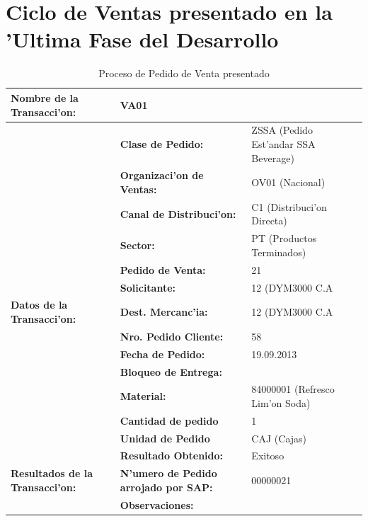 \section{Ciclo de Ventas presentado en la 'Ultima Fase del Desarrollo}
\begin{table}[h!]
\footnotesize
\scalebox{0.8} {
\begin{tabular}{l l l}
\toprule
\textbf{Nombre de la Transacci'on:} & VA01 &\\
\midrule
                 & \textbf{Clase de Pedido:} & ZSSA (Pedido Est'andar SSA Beverage) \\
                 \cmidrule{2-3}
                 & \textbf{Organizaci'on de Ventas:} & OV01 (Nacional) \\
                 \cmidrule{2-3}
                 & \textbf{Canal de Distribuci'on:} & C1 (Distribuci'on Directa) \\
                 \cmidrule{2-3}
                 & \textbf{Sector:}                   &   PT (Productos Terminados) \\
                 \cmidrule{2-3}
                 & \textbf{Pedido de Venta:}            & 21 \\
                 \cmidrule{2-3}
                 & \textbf{Solicitante:}              & 12 (DYM3000 C.A \\
                \cmidrule{2-3}
  \textbf{Datos de la Transacci'on:}              & \textbf{Dest. Mercanc'ia:}   &   12 (DYM3000 C.A \\
                 \cmidrule{2-3}
                 & \textbf{Nro. Pedido Cliente:} & 58      \\
                 \cmidrule{2-3}
                 & \textbf{Fecha de Pedido:} & 19.09.2013 \\
                 \cmidrule{2-3}
                 & \textbf{Bloqueo de Entrega:}  &      \\
                 \cmidrule{2-3}
                 & \textbf{Material:} & 84000001 (Refresco Lim'on Soda) \\
                 \cmidrule{2-3}
                 & \textbf{Cantidad de pedido} & 1 \\
                 \cmidrule{2-3}
                 & \textbf{Unidad de Pedido} & CAJ (Cajas) \\
                 \midrule
                 & \textbf{Resultado Obtenido:} & Exitoso \\
                 \cmidrule{2-3}
\textbf{Resultados de la Transacci'on:}    & \textbf{N'umero de Pedido arrojado por SAP:} & 00000021 \\
                 \cmidrule{2-3}
                 & \textbf{Observaciones:} &  \\
                 \bottomrule
\end{tabular}}
\caption{Proceso de Pedido de Venta presentado}
\label{tb:pedido}
\end{table}

